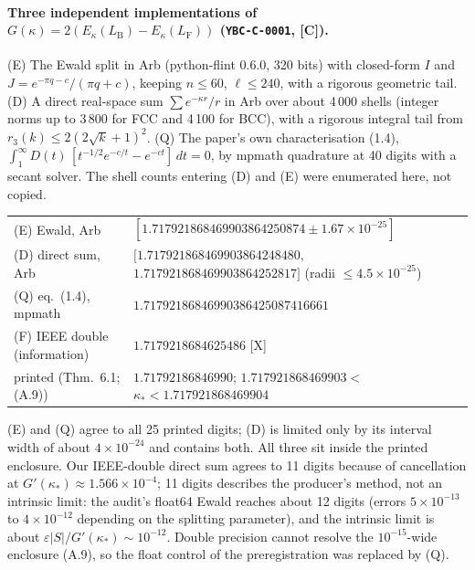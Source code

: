 \documentclass[11pt]{article}
\newcommand{\tier}[1]{\textsf{[#1]}}
\newcommand{\tC}{\tier{C}}
\newcommand{\tX}{\tier{X}}
\newcommand{\LF}{L_{\mathrm F}}
\newcommand{\LB}{L_{\mathrm B}}
\newcommand{\ks}{\kappa_*}
\begin{document}
\paragraph{Three independent implementations of $G(\kappa)=2(E_\kappa(\LB)-E_\kappa(\LF))$ (\texttt{YBC-C-0001}, \tC).}
(E) The Ewald split in Arb (python-flint 0.6.0, 320 bits) with closed-form $I$ and $J=e^{-\pi q-c}/(\pi q+c)$, keeping $n\le60$, $\ell\le240$, with a rigorous geometric tail.
(D) A direct real-space sum $\sum e^{-\kappa r}/r$ in Arb over about 4\,000 shells (integer norms up to 3\,800 for FCC and 4\,100 for BCC), with a rigorous integral tail from $r_3(k)\le2(2\sqrt k+1)^2$.
(Q) The paper's own characterisation (1.4), $\int_1^\infty D(t)\,[t^{-1/2}e^{-c/t}-e^{-ct}]\,dt=0$, by mpmath quadrature at 40 digits with a secant solver. The shell counts entering (D) and (E) were enumerated here, not copied.
\begin{center}\small\begin{tabular}{@{}lp{8.2cm}@{}}\toprule
(E) Ewald, Arb & $[1.717921868469903864250874\pm1.67\times10^{-25}]$\\
(D) direct sum, Arb & $[1.717921868469903864248480,$ $1.717921868469903864252817]$ (radii $\le4.5\times10^{-25}$)\\
(Q) eq.~(1.4), mpmath & $1.71792186846990386425087416661$\\
(F) IEEE double (information) & $1.7179218684625486$ \tX{}\\
printed (Thm.~6.1; (A.9)) & $1.71792186846990$; $1.717921868469903<$ $\ks<1.717921868469904$\\\bottomrule
\end{tabular}\end{center}
(E) and (Q) agree to all 25 printed digits; (D) is limited only by its interval width of about $4\times10^{-24}$ and contains both. All three sit inside the printed enclosure. Our IEEE-double direct sum agrees to 11 digits because of cancellation at $G'(\ks)\approx1.566\times10^{-4}$; 11 digits describes the producer's method, not an intrinsic limit: the audit's float64 Ewald reaches about 12 digits (errors $5\times10^{-13}$ to $4\times10^{-12}$ depending on the splitting parameter), and the intrinsic limit is about $\varepsilon|S|/G'(\ks)\sim10^{-12}$.
Double precision cannot resolve the $10^{-15}$-wide enclosure (A.9), so the float control of the preregistration was replaced by (Q).
\end{document}
